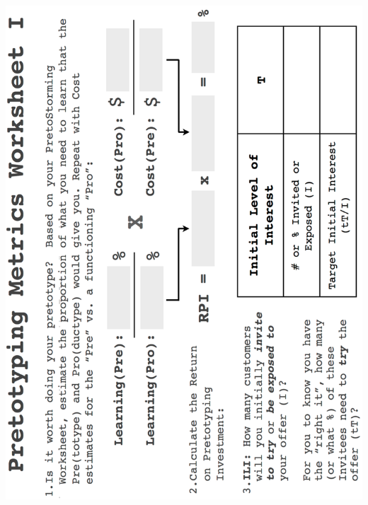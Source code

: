 \documentclass{article}
\begin{document}
\begin{center}
    \includegraphics[width=1.1\textwidth]{metrics_1.png}
\end{center}
\clearpage
\end{document}
